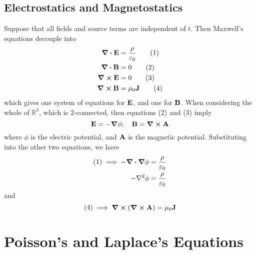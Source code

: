 \documentclass{article}
\begin{document}
\subsection{Electrostatics and Magnetostatics}
Suppose that all fields and source terms are independent of $t$. Then Maxwell's equations decouple into
\begin{align}
    \div{\vb E}  & = \frac{\rho}{\varepsilon_0} \tag{1} \\
    \div{\vb B}  & = 0                          \tag{2} \\
    \curl{\vb E} & = 0                          \tag{3} \\
    \curl{\vb B} & = \mu_0 \vb J \tag{4}
\end{align}
which gives one system of equations for $\vb E$, and one for $\vb B$. When considering the whole of $\mathbb R^3$, which is 2-connected, then equations (2) and (3) imply
\[ \vb E = -\grad \phi;\quad \vb B = \curl \vb A \]
where $\phi$ is the electric potential, and $\vb A$ is the magnetic potential. Substituting into the other two equations, we have
\begin{align*}
    (1) \implies -\div{\grad \phi} & = \frac{\rho}{\varepsilon_0} \\
    -\laplacian \phi               & = \frac{\rho}{\varepsilon_0}
\end{align*}
and
\[ (4) \implies \curl(\curl{\vb A}) = \mu_0 \vb J \]

\section{Poisson's and Laplace's Equations}
\end{document}
